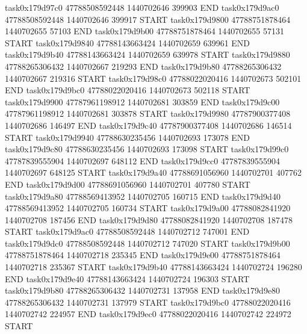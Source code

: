task0x179d97c0 47788508592448          1440702646               399903  END
task0x179d9ac0 47788508592448          1440702646               399917  START
task0x179d9800 47788751878464          1440702655                57103  END
task0x179d9b00 47788751878464          1440702655                57131  START
task0x179d9840 47788143663424          1440702659               639961  END
task0x179d9b40 47788143663424          1440702659               639978  START
task0x179d9880 47788265306432          1440702667               219293  END
task0x179d9b80 47788265306432          1440702667               219316  START
task0x179d98c0 47788022020416          1440702673               502101  END
task0x179d9bc0 47788022020416          1440702673               502118  START
task0x179d9900 47787961198912          1440702681               303859  END
task0x179d9c00 47787961198912          1440702681               303878  START
task0x179d9980 47787900377408          1440702686               146497  END
task0x179d9c40 47787900377408          1440702686               146514  START
task0x179d9940 47788630235456          1440702693               173078  END
task0x179d9c80 47788630235456          1440702693               173098  START
task0x179d99c0 47787839555904          1440702697               648112  END
task0x179d9cc0 47787839555904          1440702697               648125  START
task0x179d9a40 47788691056960          1440702701               407762  END
task0x179d9d00 47788691056960          1440702701               407780  START
task0x179d9a80 47788569413952          1440702705               160715  END
task0x179d9d40 47788569413952          1440702705               160734  START
task0x179d9a00 47788082841920          1440702708               187456  END
task0x179d9d80 47788082841920          1440702708               187478  START
task0x179d9ac0 47788508592448          1440702712               747001  END
task0x179d9dc0 47788508592448          1440702712               747020  START
task0x179d9b00 47788751878464          1440702718               235345  END
task0x179d9e00 47788751878464          1440702718               235367  START
task0x179d9b40 47788143663424          1440702724               196280  END
task0x179d9e40 47788143663424          1440702724               196303  START
task0x179d9b80 47788265306432          1440702731               137958  END
task0x179d9e80 47788265306432          1440702731               137979  START
task0x179d9bc0 47788022020416          1440702742               224957  END
task0x179d9ec0 47788022020416          1440702742               224972  START
